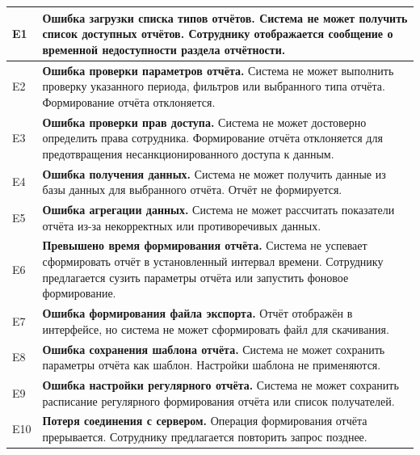 \documentclass[12pt,a4paper]{article}
\begin{document}
\begin{xltabular}{\textwidth}{
				|>{\raggedright\arraybackslash}p{2.7cm}
				|>{\raggedright\arraybackslash}X|
			}
			E1 &
			\textbf{Ошибка загрузки списка типов отчётов.}
			Система не может получить список доступных отчётов. Сотруднику
			отображается сообщение о временной недоступности раздела отчётности. \\
			\hline
			
			E2 &
			\textbf{Ошибка проверки параметров отчёта.}
			Система не может выполнить проверку указанного периода, фильтров
			или выбранного типа отчёта. Формирование отчёта отклоняется. \\
			\hline
			
			E3 &
			\textbf{Ошибка проверки прав доступа.}
			Система не может достоверно определить права сотрудника.
			Формирование отчёта отклоняется для предотвращения
			несанкционированного доступа к данным. \\
			\hline
			
			E4 &
			\textbf{Ошибка получения данных.}
			Система не может получить данные из базы данных для выбранного
			отчёта. Отчёт не формируется. \\
			\hline
			
			E5 &
			\textbf{Ошибка агрегации данных.}
			Система не может рассчитать показатели отчёта из-за некорректных
			или противоречивых данных. \\
			\hline
			
			E6 &
			\textbf{Превышено время формирования отчёта.}
			Система не успевает сформировать отчёт в установленный интервал
			времени. Сотруднику предлагается сузить параметры отчёта или
			запустить фоновое формирование. \\
			\hline
			
			E7 &
			\textbf{Ошибка формирования файла экспорта.}
			Отчёт отображён в интерфейсе, но система не может сформировать файл
			для скачивания. \\
			\hline
			
			E8 &
			\textbf{Ошибка сохранения шаблона отчёта.}
			Система не может сохранить параметры отчёта как шаблон. Настройки
			шаблона не применяются. \\
			\hline
			
			E9 &
			\textbf{Ошибка настройки регулярного отчёта.}
			Система не может сохранить расписание регулярного формирования
			отчёта или список получателей. \\
			\hline
			
			E10 &
			\textbf{Потеря соединения с сервером.}
			Операция формирования отчёта прерывается. Сотруднику предлагается
			повторить запрос позднее. \\
			\hline
			

\end{xltabular}
\end{document}
